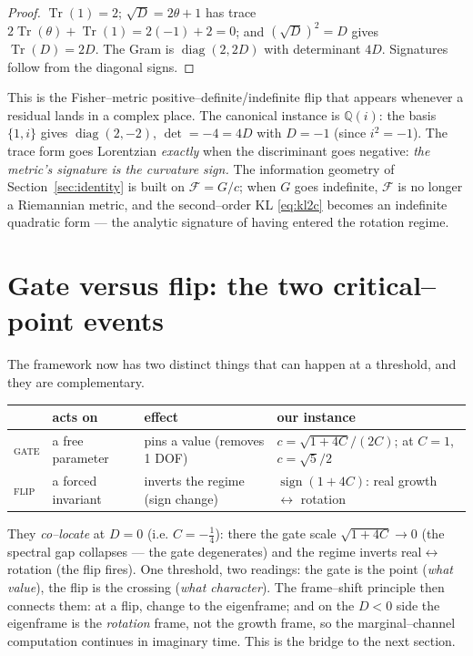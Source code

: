 \documentclass[11pt]{article}
\theoremstyle{plain}
\theoremstyle{definition}
\theoremstyle{remark}
\newcommand{\Q}{\mathbb{Q}}
\newcommand{\tr}{\operatorname{Tr}}
\begin{document}
\begin{proof}
$\tr(1)=2$; $\sqrt D=2\theta+1$ has trace $2\tr(\theta)+\tr(1)=2(-1)+2=0$; and $(\sqrt D)^2=D$ gives $\tr(D)=2D$. The Gram is $\operatorname{diag}(2,2D)$ with determinant $4D$. Signatures follow from the diagonal signs.
\end{proof}

\noindent This is the Fisher--metric positive--definite/indefinite flip that appears whenever a residual lands in a complex place. The canonical instance is $\Q(i)$: the basis $\{1,i\}$ gives $\operatorname{diag}(2,-2)$, $\det=-4=4D$ with $D=-1$ (since $i^2=-1$). The trace form goes Lorentzian \emph{exactly} when the discriminant goes negative: \emph{the metric's signature is the curvature sign.} The information geometry of Section~\ref{sec:identity} is built on $\mathcal F = G/c$; when $G$ goes indefinite, $\mathcal F$ is no longer a Riemannian metric, and the second--order KL \eqref{eq:kl2c} becomes an indefinite quadratic form --- the analytic signature of having entered the rotation regime.

\section{Gate versus flip: the two critical--point events}\label{sec:gateflip}

The framework now has two distinct things that can happen at a threshold, and they are complementary.

\begin{center}
\renewcommand{\arraystretch}{1.4}
\begin{tabular}{@{}llll@{}}
\toprule
 & acts on & effect & our instance \\
\midrule
\textsc{gate} & a free parameter & pins a value (removes 1 DOF) & $c = \sqrt{1+4C}/(2C)$; at $C=1$, $c=\sqrt5/2$ \\
\textsc{flip} & a forced invariant & inverts the regime (sign change) & $\operatorname{sign}(1+4C)$: real growth $\leftrightarrow$ rotation \\
\bottomrule
\end{tabular}
\end{center}

\noindent They \emph{co--locate} at $D=0$ (i.e. $C=-\tfrac14$): there the gate scale $\sqrt{1+4C}\to0$ (the spectral gap collapses --- the gate degenerates) and the regime inverts real$\leftrightarrow$rotation (the flip fires). One threshold, two readings: the gate is the point (\emph{what value}), the flip is the crossing (\emph{what character}). The frame--shift principle then connects them: at a flip, change to the eigenframe; and on the $D<0$ side the eigenframe is the \emph{rotation} frame, not the growth frame, so the marginal--channel computation continues in imaginary time. This is the bridge to the next section.
\end{document}
